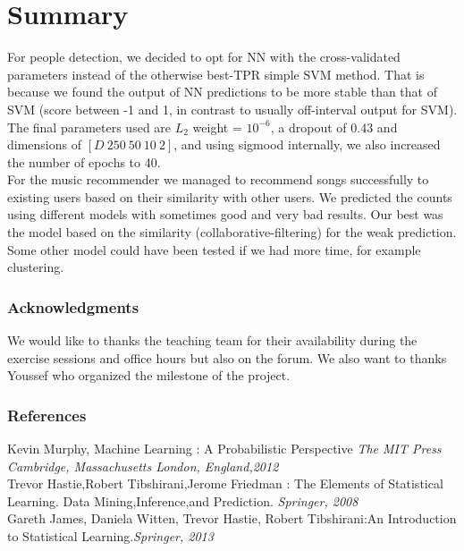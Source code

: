 \documentclass{article} %
\begin{document}
\section{Summary}
For people detection, we decided to opt for NN with the cross-validated parameters instead of the otherwise best-TPR simple SVM method. That is because we found the output of NN predictions to be more stable than that of SVM (score between -1 and 1, in contrast to usually off-interval output for SVM). The final parameters used are $L_2$ weight = $10^{-6}$, a dropout of 0.43 and dimensions of $[D \ 250 \ 50 \ 10 \  2]$, and using sigmood internally, we also increased the number of epochs to 40.\\

For the music recommender we managed to recommend songs successfully to existing users based on their similarity with other users. We predicted the counts using different models with sometimes good and very bad results. Our best was the model based on the similarity (collaborative-filtering) for the weak prediction. Some other model could have been tested if we had more time, for example clustering.
\subsubsection*{Acknowledgments}
We would like to thanks the teaching team for their availability during the exercise sessions and office hours but also on the forum. We also want to thanks Youssef who organized the milestone of the project.
\subsubsection*{References}
Kevin Murphy, Machine Learning : A Probabilistic Perspective {\em The MIT Press
Cambridge, Massachusetts
London, England,2012}\\
Trevor Hastie,Robert Tibshirani,Jerome Friedman : The Elements of
Statistical Learning. Data Mining,Inference,and Prediction. {\em Springer, 2008}\\
Gareth James,
Daniela Witten,
Trevor Hastie,
Robert Tibshirani:An Introduction to Statistical Learning.{\em Springer, 2013}
\end{document}

